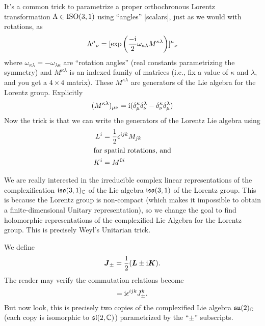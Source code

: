 It's a common trick to parametrize a proper orthochronous Lorentz
transformation $\Lambda\in\mathrm{ISO}(3,1)$ using 
``angles'' [scalars], just as we would with rotations, as
\begin{equation}
{\Lambda^{\mu}}_{\nu} = [\exp\left(\frac{-\mathrm{i}}{2}\omega_{\kappa\lambda}M^{\kappa\lambda}\right)]{{}^{\mu}}_{\nu}
\end{equation}
where $\omega_{\kappa\lambda}=-\omega_{\lambda\kappa}$ are ``rotation
angles'' (real constants parametrizing the symmetry) and
$M^{\kappa\lambda}$ is an indexed family of matrices (i.e., fix a value
of $\kappa$ and $\lambda$, and you get a $4\times4$ matrix). These $M^{\kappa\lambda}$ are
generators of the Lie algebra for the Lorentz group. Explicitly
\begin{equation}
(M^{\kappa\lambda})_{\mu\nu} = \mathrm{i}(\delta^{\kappa}_{\mu}\delta^{\lambda}_{\nu}-\delta^{\kappa}_{\nu}\delta^{\lambda}_{\mu})
\end{equation}
Now the trick is that we can write the generators of the Lorentz Lie
algebra using
\begin{subequations}
\begin{align}
L^{i} &= \frac{1}{2}\epsilon^{ijk}M_{jk}\\
\intertext{for spatial rotations, and}
K^{i} &= M^{0i}%
\end{align}
\end{subequations}

We are really interested in the irreducible complex linear
representations of the complexification $\mathfrak{iso}(3,1)_{\mathbb{C}}$ of the Lie
algebra $\mathfrak{iso}(3,1)$ of the Lorentz group. This is because the Lorentz
group is non-compact (which makes it impossible to obtain a
finite-dimensional Unitary representation), so we change the goal to
find holomorphic representations of the complexified Lie Algebra for the
Lorentz group. This is precisely Weyl's Unitarian trick.

We define
\begin{equation}
\boldsymbol{J}_{\pm} = \frac{1}{2}(\boldsymbol{L}\pm\mathrm{i}\boldsymbol{K}).
\end{equation}
The reader may verify the commutation relations become
\begin{equation}
[J^{i}_{\pm}, J^{j}_{\pm}] = \I\epsilon^{ijk}J^{k}_{\pm}.
\end{equation}
But now look, this is precisely two copies of the complexified Lie
algebra $\mathfrak{su}(2)_{\mathbb{C}}$ (each copy is isomorphic to $\mathfrak{sl}(2,\mathbb{C})$)
parametrized by the ``$\pm$'' subscripts.

